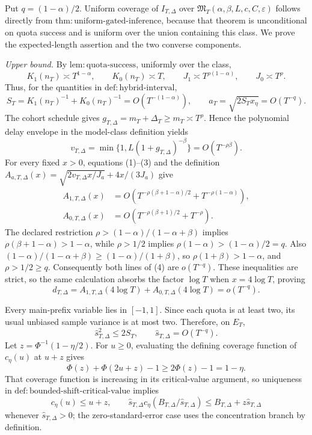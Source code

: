 Put \(q=(1-\alpha)/2\).  Uniform coverage of \(I_{T,\Delta}\) over \(\mathfrak M_T(\alpha,\beta,L,c,C,\varepsilon)\) follows directly from \(\mathrm{thm:uniform\text{-}gated\text{-}inference}\), because that theorem is unconditional on quota success and is uniform over the union containing this class.  We prove the expected-length assertion and the two converse components.

\emph{Upper bound.}
By \(\mathrm{lem:quota\text{-}success}\), uniformly over the class,
\[
 K_1(n_T)\asymp T^{1-\alpha},\qquad
 K_0(n_T)\asymp T,
 \qquad J_1\asymp T^{\rho(1-\alpha)},\qquad
 J_0\asymp T^\rho. \tag{1}
\]
Thus, for the quantities in \(\mathrm{def:hybrid\text{-}interval}\),
\[
 S_T=K_1(n_T)^{-1}+K_0(n_T)^{-1}
     =O\!\left(T^{-(1-\alpha)}\right),
 \qquad
 a_T=\sqrt{2S_Tx_\eta}=O(T^{-q}). \tag{2}
\]
The cohort schedule gives \(g_{T,\Delta}=m_T+\Delta_T\geq m_T\asymp T^\rho\).  Hence the polynomial delay envelope in the model-class definition yields
\[
 v_{T,\Delta}
 =\min\{1,L(1+g_{T,\Delta})^{-\beta}\}
 =O(T^{-\rho\beta}). \tag{3}
\]
For every fixed \(x>0\), equations (1)--(3) and the definition
\(
A_{a,T,\Delta}(x)=\sqrt{2v_{T,\Delta}x/J_a}+4x/(3J_a)
\)
give
\[
 \begin{aligned}
 A_{1,T,\Delta}(x)
 &=O\!\left(T^{-\rho(\beta+1-\alpha)/2}
          +T^{-\rho(1-\alpha)}\right),\\
 A_{0,T,\Delta}(x)
 &=O\!\left(T^{-\rho(\beta+1)/2}+T^{-\rho}\right).
 \end{aligned} \tag{4}
\]
The declared restriction
\(
\rho>(1-\alpha)/(1-\alpha+\beta)
\)
implies \(\rho(\beta+1-\alpha)>1-\alpha\), while \(\rho>1/2\) implies \(\rho(1-\alpha)>(1-\alpha)/2=q\).  Also
\(
(1-\alpha)/(1-\alpha+\beta)\geq(1-\alpha)/(1+\beta)
\), so \(\rho(1+\beta)>1-\alpha\), and \(\rho>1/2\geq q\).  Consequently both lines of (4) are \(o(T^{-q})\).  These inequalities are strict, so the same calculation absorbs the factor \(\log T\) when \(x=4\log T\), proving
\[
 d_{T,\Delta}
 =A_{1,T,\Delta}(4\log T)+A_{0,T,\Delta}(4\log T)
 =o(T^{-q}). \tag{5}
\]

Every main-prefix variable lies in \([-1,1]\).  Since each quota is at least two, its usual unbiased sample variance is at most two.  Therefore, on \(E_T\),
\[
 \widehat s_{T,\Delta}^2\leq2S_T,
 \qquad \widehat s_{T,\Delta}=O(T^{-q}). \tag{6}
\]
Let \(z=\Phi^{-1}(1-\eta/2)\).  For \(u\geq0\), evaluating the defining coverage function of \(c_\eta(u)\) at \(u+z\) gives
\[
 \Phi(z)+\Phi(2u+z)-1\geq2\Phi(z)-1=1-\eta.
\]
That coverage function is increasing in its critical-value argument, so uniqueness in \(\mathrm{def:bounded\text{-}shift\text{-}critical\text{-}value}\) implies
\[
 c_\eta(u)\leq u+z,
 \qquad
 \widehat s_{T,\Delta}c_\eta(B_{T,\Delta}/\widehat s_{T,\Delta})
 \leq B_{T,\Delta}+z\widehat s_{T,\Delta} \tag{7}
\]
whenever \(\widehat s_{T,\Delta}>0\); the zero-standard-error case uses the concentration branch by definition.

